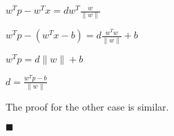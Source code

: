 $w^Tp-w^Tx = dw^T\frac{w}{\|w\|}$

$w^Tp-(w^Tx-b) = d\frac{w^Tw}{\|w\|}+b$

$w^Tp = d\|w\| + b$

$d = \frac{w^Tp-b}{\|w\|}$

The proof for the other case is similar.

$\blacksquare$











